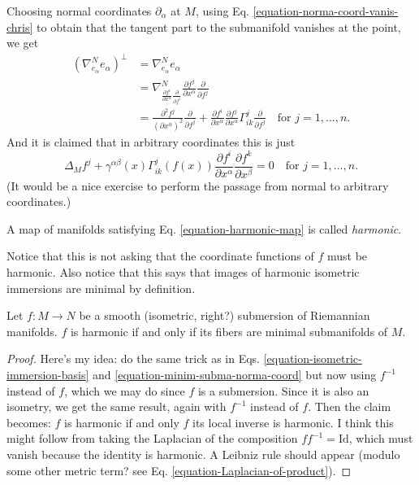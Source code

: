 \documentclass{book}
\begin{document}
Choosing normal coordinates $\partial_\alpha$
at $M$, using Eq.
\ref{equation-norma-coord-vanis-chris} to
obtain
that the tangent part to the submanifold
vanishes at the point, we get
\begin{equation}
\label{equation-minim-subma-norma-coord}
\begin{aligned}
(\nabla^N_{e_\alpha}e_\alpha)^\perp&=
\nabla^N_{e_\alpha}e_\alpha\\
&=\nabla^N
_{\frac{\partial f^i}{\partial
x^\alpha}\frac{\partial }{\partial f^i}}
\frac{\partial f^j}{\partial
x^\alpha}\frac{\partial }{\partial f^j}\\
&=\frac{\partial^2 f^j}{(\partial
x^\alpha)^2}\frac{\partial }{\partial f^j}
+\frac{\partial f^i}{\partial
x^\alpha}\frac{\partial f^j}{\partial
x^\alpha}
\Gamma^j_{ik}\frac{\partial }{\partial
f^j}\quad \text{for }j=1,\ldots,n.
\end{aligned}
\end{equation}
And it is claimed that in arbitrary
coordinates this is just
\begin{equation}
\label{equation-harmonic-map}
\Delta_Mf^j+\gamma^{\alpha
\beta}(x)\Gamma^j_{ik}(f(x))
\frac{\partial f^i}{\partial
x^\alpha}\frac{\partial f^k}{\partial
x^\beta}=0
\quad \text{for }j=1,\ldots,n.
\end{equation}
(It would be a nice exercise to perform the
passage from normal to arbitrary
coordinates.)
\begin{definition}
\label{definition-harmonic-map}
A map of manifolds satisfying Eq.
\ref{equation-harmonic-map} is
called {\it harmonic}.
\end{definition}
Notice that this is not asking that the
coordinate
functions of $f$ must be harmonic. Also
notice that this says that images of
harmonic isometric immersions are minimal by
definition.

\begin{lemma}
\label{lemma-fibers-of-harmonic-submersion}
Let $f:M\to N$ be a smooth (isometric,
right?) submersion of
Riemannian manifolds. $f$ is
harmonic if and only if its fibers are
minimal submanifolds of $M$.
\end{lemma}

\begin{proof}
Here's my idea: do the same trick as in Eqs.
\ref{equation-isometric-immersion-basis} and
\ref{equation-minim-subma-norma-coord} but
now using
$f^{-1}$ instead of $f$, which we may do
since $f$ is a submersion. Since it is
also an isometry, we get the same result,
again with $f^{-1}$ instead of $f$.
Then the claim becomes: $f$ is harmonic if
and only $f$ its local inverse is
harmonic. I think this might follow from
taking the Laplacian of the composition
$f f^{-1}=\text{Id}$, which must vanish
because the identity is harmonic. A
Leibniz rule should appear (modulo some other
metric term? see Eq.
\ref{equation-Laplacian-of-product}).
\end{proof}
\end{document}
